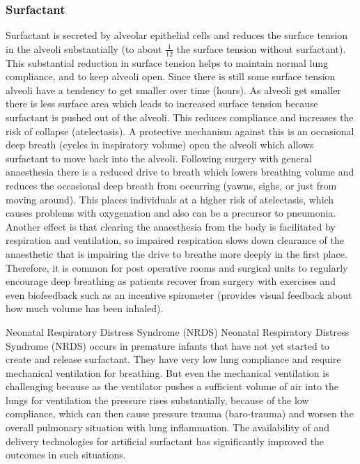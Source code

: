 \subsubsection{Surfactant} 
Surfactant is secreted by alveolar epithelial cells and reduces the surface tension in the alveoli substantially (to about $\frac{1}{12}$ the surface tension without surfactant). This substantial reduction in surface tension helps to maintain normal lung compliance, and to keep alveoli open. Since there is still some surface tension alveoli have a tendency to get smaller over time (hours). As alveoli get smaller there is less surface area which leads to increased surface tension because surfactant is pushed out of the alveoli. This reduces compliance and increases the risk of collapse (atelectasis). A protective mechanism against this is an occasional deep breath (cycles in inspiratory volume) open the alveoli which allows surfactant to move back into the alveoli. Following surgery with general anaesthesia there is a reduced drive to breath which lowers breathing volume and reduces the occasional deep breath from occurring (yawns, sighs, or just from moving around). This places individuals at a higher risk of atelectasis, which causes problems with oxygenation and also can be a precursor to pneumonia. Another effect is that clearing the anaesthesia from the body is facilitated by respiration and ventilation, so impaired respiration slows down clearance of the anaesthetic that is impairing the drive to breathe more deeply in the first place. Therefore, it is common for post operative rooms and surgical units to regularly encourage deep breathing as patients recover from surgery with exercises and even biofeedback such as an incentive spirometer (provides visual feedback about how much volume has been inhaled). 

\begin{warning}{Neonatal Respiratory Distress Syndrome (NRDS)}
    Neonatal Respiratory Distress Syndrome (NRDS) occurs in premature infants that have not yet started to create and release surfactant. They have very low lung compliance and require mechanical ventilation for breathing. But even the mechanical ventilation is challenging because as the ventilator pushes a sufficient volume of air into the lungs for ventilation the pressure rises substantially, because of the low compliance, which can then cause pressure trauma (baro-trauma) and worsen the overall pulmonary situation with lung inflammation. The availability of and delivery technologies for artificial surfactant has significantly improved the outcomes in such situations.
\end{warning}

